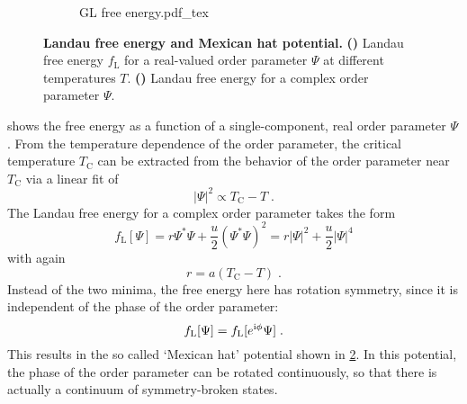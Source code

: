 \documentclass[../main.tex]{subfiles}
\begin{document}
\begin{figure}[t]
	\centering
	\begin{subfigure}[b]{0.5\textwidth}
		\centering
		\caption{\hfill\null}\label{sfig:Landau free energy}
		
	\end{subfigure}%
	\begin{subfigure}[b]{0.5\textwidth}
		\centering
		\caption{\hfill\null}\label{sfig:Ginzburg Landau free energy}
		{GL free energy.pdf_tex}
	\end{subfigure}
	\caption[Landau free energy and Mexican hat potential.]{
		\textbf{Landau free energy and Mexican hat potential.} \textbf{()} Landau free energy \(f_{\mathrm{L}}\) for a real-valued order parameter \(\Psi\) at different temperatures \(T\). \textbf{()} Landau free energy for a complex order parameter \(\Psi\).
	} 
	\label{fig:Landau free energy and Ginzburg-Landau free energy}
\end{figure}

 shows the free energy as a function of a single-component, real order parameter \(\Psi\).
From the temperature dependence of the order parameter, the critical temperature \(T_{\mathrm{C}}\) can be extracted from the behavior of the order parameter near \(T_{\mathrm{C}}\) via a linear fit of
\begin{equation}
	\vert \Psi \vert^2 \propto T_{\mathrm{C}} - T \;.
	\label{eq:extract TC via OP}
\end{equation}
The Landau free energy for a complex order parameter takes the form
\begin{equation}
	f_{\mathrm{L}} [\Psi] = r \Psi^* \Psi + \frac{u}{2} (\Psi^* \Psi)^2 = r \vert \Psi \vert^2 + \frac{u}{2} \vert \Psi \vert^4
\end{equation}
with again
\begin{equation}
	r = a(T_{\mathrm{C}} - T) \;.
\end{equation}
Instead of the two minima, the free energy here has rotation symmetry, since it is independent of the phase of the order parameter: 
\begin{equation}
	f_{\mathrm{L}} [\Psi] = f_{\mathrm{L}} [e^{\mathrm{i} \phi} \Psi] \;.
\end{equation}
This results in the so called `Mexican hat' potential shown in \cref{sfig:Ginzburg Landau free energy}.
In this potential, the phase of the order parameter can be rotated continuously, so that there is actually a continuum of symmetry-broken states.
\end{document}
